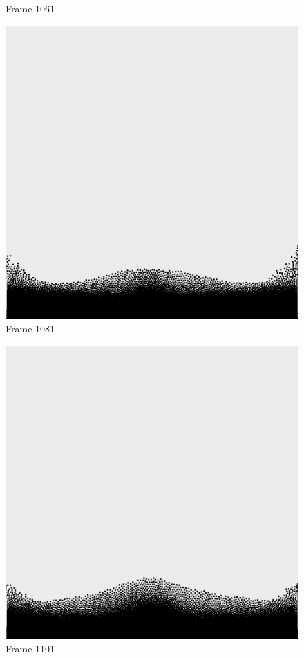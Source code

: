 \documentclass[a4paper, 12pt, oneside]{book}
\begin{document}
\begin{figure}[!ht]
\begin{center}
            Frame 1061
        \end{center}
    \endminipage
    \hfill
        \begin{center}
            \includegraphics[width=\linewidth]{images/test_case_1/1081.png}
            Frame 1081
        \end{center}
    \endminipage
    \hfill
        \begin{center}
            \includegraphics[width=\linewidth]{images/test_case_1/1101.png}
            Frame 1101
        \end{center}
    \endminipage
    \hfill


\end{figure}
\end{document}
